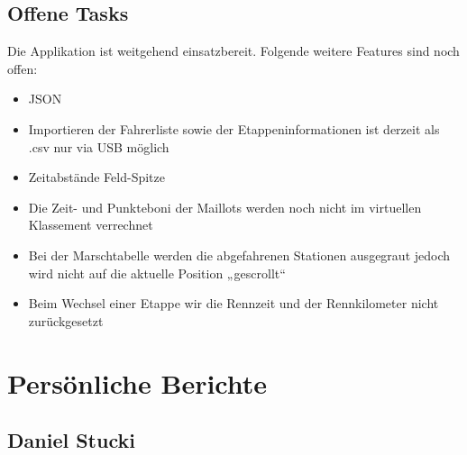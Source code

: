 \subsection{Offene Tasks}
Die Applikation ist weitgehend einsatzbereit. Folgende weitere Features sind noch offen:
\begin{itemize}
\item JSON
\item Importieren der Fahrerliste sowie der Etappeninformationen ist derzeit als .csv nur via USB möglich
\item Zeitabstände Feld-Spitze
\item Die Zeit- und Punkteboni der Maillots werden noch nicht im virtuellen Klassement verrechnet
\item Bei der Marschtabelle werden die abgefahrenen Stationen ausgegraut jedoch wird nicht auf die aktuelle Position „gescrollt“
\item Beim Wechsel einer Etappe wir die Rennzeit und der Rennkilometer nicht zurückgesetzt
\end{itemize}



\section{Persönliche Berichte}

\subsection{Daniel Stucki}

